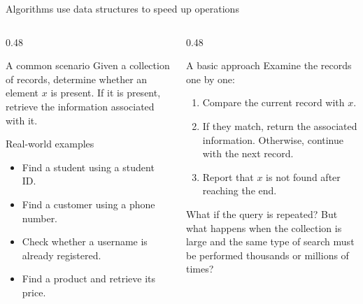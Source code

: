 \documentclass[aspectratio=169]{beamer}
\begin{document}
\begin{frame}{Algorithms use data structures to speed up operations}
  \small

  \begin{columns}[T]
    \begin{column}{0.48\textwidth}
      \begin{block}{A common scenario}
        Given a collection of records, determine whether an element $x$ is present. If it is present, retrieve the information associated with it.
      \end{block}

      \begin{exampleblock}{Real-world examples}
        \begin{itemize}
          \item Find a student using a student ID.
          \item Find a customer using a phone number.
          \item Check whether a username is already registered.
          \item Find a product and retrieve its price.
        \end{itemize}
      \end{exampleblock}
    \end{column}

    \begin{column}{0.48\textwidth}
      \begin{block}{A basic approach}
        Examine the records one by one:
        \begin{enumerate}
          \item Compare the current record with $x$.
          \item If they match, return the associated information. Otherwise, continue with the next record.
          \item Report that $x$ is not found after reaching the end.
        \end{enumerate}
      \end{block}

      \begin{alertblock}{What if the query is repeated?}
        But what happens when the collection is large and the same type of search must be performed thousands or millions of times?
      \end{alertblock}
    \end{column}
  \end{columns}
\end{frame}
\end{document}
